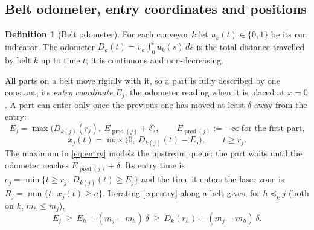 \documentclass[11pt,a4paper]{article}
\theoremstyle{plain}
\theoremstyle{definition}
\newtheorem{definition}{Definition}
\theoremstyle{remark}
\newcommand{\pred}{\operatorname{pred}}
\begin{document}
\subsection{Belt odometer, entry coordinates and positions}
\begin{definition}[Belt odometer]
For each conveyor $k$ let $u_k(t)\in\{0,1\}$ be its run indicator. The odometer
$D_k(t)=v_k\int_0^t u_k(s)\,ds$ is the total distance travelled by belt $k$ up to time
$t$; it is continuous and non-decreasing.
\end{definition}
All parts on a belt move rigidly with it, so a part is fully described by one constant,
its \emph{entry coordinate} $E_j$, the odometer reading when it is placed at $x=0$. A part
can enter only once the previous one has moved at least $\delta$ away from the entry:
\begin{equation}\label{eq:entry}
E_j=\max\bigl(D_{k(j)}(r_j),\ E_{\pred(j)}+\delta\bigr),\qquad E_{\pred(j)}:=-\infty\ \text{for the first part,}
\end{equation}
\begin{equation}\label{eq:pos}
x_j(t)=\max\bigl(0,\ D_{k(j)}(t)-E_j\bigr),\qquad t\ge r_j .
\end{equation}
The maximum in \eqref{eq:entry} models the upstream queue: the part waits until the
odometer reaches $E_{\pred(j)}+\delta$. Its entry time is $e_j=\min\{t\ge r_j:\
D_{k(j)}(t)\ge E_j\}$ and the time it enters the laser zone is $R_j=\min\{t:\ x_j(t)\ge a\}$.
Iterating \eqref{eq:entry} along a belt gives, for $h\preceq_k j$ (both on $k$, $m_h\le m_j$),
\begin{equation}\label{eq:iter}
E_j\ \ge\ E_h+(m_j-m_h)\,\delta\ \ge\ D_k(r_h)+(m_j-m_h)\,\delta .
\end{equation}
\end{document}
